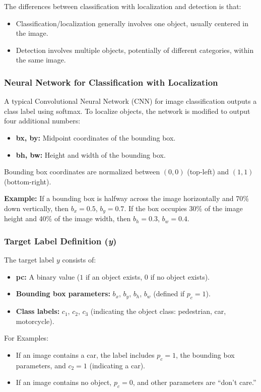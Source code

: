 \documentclass[letterpaper,12pt,notitlepage,twoside]{report}
\begin{document}
The differences between classification with localization and detection is that:
\begin{itemize}
    \item Classification/localization generally involves one object, usually centered in the image.
    \item Detection involves multiple objects, potentially of different categories, within the same image.
\end{itemize}

\subsubsection*{Neural Network for Classification with Localization}
A typical Convolutional Neural Network (CNN) for image classification outputs a class label using softmax. To localize objects, the network is modified to output four additional numbers:
\begin{itemize}
    \item \textbf{bx, by:} Midpoint coordinates of the bounding box.
    \item \textbf{bh, bw:} Height and width of the bounding box.
\end{itemize}

Bounding box coordinates are normalized between $(0,0)$ (top-left) and $(1,1)$ (bottom-right).

\textbf{Example:} If a bounding box is halfway across the image horizontally and 70\% down vertically, then $b_x = 0.5$, $b_y = 0.7$. If the box occupies 30\% of the image height and 40\% of the image width, then $b_h = 0.3$, $b_w = 0.4$.

\subsubsection*{Target Label Definition (\textit{y})}
The target label $y$ consists of:
\begin{itemize}[nosep]
    \item \textbf{pc:} A binary value ($1$ if an object exists, $0$ if no object exists).
    \item \textbf{Bounding box parameters:} $b_x$, $b_y$, $b_h$, $b_w$ (defined if $p_c = 1$).
    \item \textbf{Class labels:} $c_1$, $c_2$, $c_3$ (indicating the object class: pedestrian, car, motorcycle).
\end{itemize}

For Examples: 
\begin{itemize}[nosep]
    \item If an image contains a car, the label includes $p_c = 1$, the bounding box parameters, and $c_2 = 1$ (indicating a car).
    \item If an image contains no object, $p_c = 0$, and other parameters are ``don't care.''
\end{itemize}
\end{document}

